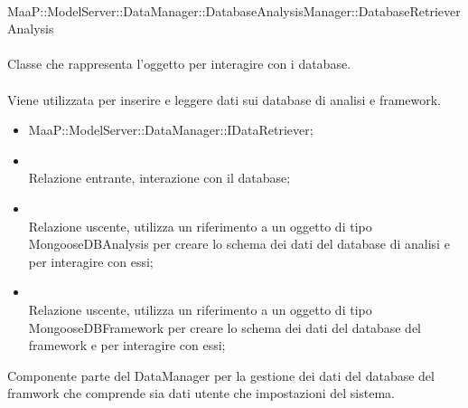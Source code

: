 \\
MaaP::ModelServer::DataManager::DatabaseAnalysisManager::DatabaseRetrieverAnalysis\\
\\
Classe che rappresenta l'oggetto per interagire con i database.\\
\\
Viene utilizzata per inserire e leggere dati sui database di analisi e framework.\\
\begin{itemize}
\item MaaP::ModelServer::DataManager::IDataRetriever;
\end{itemize}
\begin{itemize}
\item{}\\
Relazione entrante, interazione con il database;
\item{}\\
Relazione uscente, utilizza un riferimento a un oggetto di tipo MongooseDBAnalysis per creare lo schema dei dati del database di analisi e per interagire con essi;
\item{}\\
Relazione uscente, utilizza un riferimento a un oggetto di tipo MongooseDBFramework per creare lo schema dei dati del database del framework e per interagire con essi;
\end{itemize}


Componente parte del DataManager per la gestione dei dati del database del framwork che comprende sia dati utente che impostazioni del sistema.

